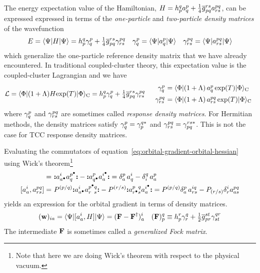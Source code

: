 \documentclass[11pt]{article}
\numberwithin{equation}{section}
\begin{document}
\begin{dfn}
The energy expectation value of the Hamiltonian,
$
  H
=
  h_p^q
  a^p_q
+
  \tfrac{1}{4}
  \overline{g}_{pq}^{rs}
  a^{pq}_{rs}
$,
can be expressed expressed in terms of the \textit{one-particle} and \textit{two-particle density matrices} of the wavefunction
\begin{align}
\label{eq:one-and-two-particle-density-matrices}
  E
=
  \langle\Psi |H|\Psi \rangle
=
  h_p^q
  \gamma ^p_q
+
  \tfrac{1}{4}
  \overline{g}_{pq}^{rs}
  \gamma ^{pq}_{rs}
&&
  \gamma ^p_q
=
  \langle\Psi |a^p_q|\Psi \rangle
&&
  \gamma ^{pq}_{rs}
=
  \langle\Psi |a^{pq}_{rs}|\Psi \rangle
\end{align}
which generalize the one-particle reference density matrix that we have already encountered.
In traditional coupled-cluster theory, this expectation value is the coupled-cluster Lagrangian and we have
\begin{align}
  \mc{L}
=
  \ip{\F|(1+\La)H\mr{exp}(T)|\F}_\mr{C}
=
  h_p^q
  \g^p_q
+
  \tfr{1}{4}
  \ol{g}_{pq}^{rs}
  \g^{pq}_{rs}
&&
\begin{array}{r@{\ }l}
  \g^p_q
&=
  \ip{\F|(1 + \La)\, a^p_q\,\mr{exp}(T)|\F}_\mr{C}
\\[5pt]
  \g^{pq}_{rs}
&=
  \ip{\F|(1 + \La)\, a^{pq}_{rs}\,\mr{exp}(T)|\F}_\mr{C}
\end{array}
\end{align}
where $\gamma ^p_q$ and $\gamma ^{pq}_{rs}$ are sometimes called \textit{response density matrices}.
For Hermitian methods, the density matrices satisfy $\gamma ^p_q=\gamma ^{q*}_{p}$ and $\gamma ^{pq}_{rs}=\gamma ^{rs*}_{pq}$.
This is not the case for TCC response density matrices.
\end{dfn}


\begin{rmk}
Evaluating the commutators of equation~\ref{eq:orbital-gradient-orbital-hessian} using Wick's theorem\footnote{
  Note that here we are doing Wick's theorem with respect to the physical vacuum.
}
\begin{align}
  [a_a^i, a^p_q]
=&\
  \no{
    a^i_{a^\ptcl}
    a^{p^\ptcl}_q
  }
-
  \no{
    a^p_{q^\ptcl}
    a^{i^\ptcl}_a
  }
=
  \d^p_a\,
  a^i_q
-
  \d^q_i\,
  a^p_a
\\
  [a_a^i, a^{pq}_{rs}]
=&\
  P^{(p/q)}
  \no{
    a^i_{a^\ptcl}
    a^{p^\ptcl q}_{r^{\phantom\ptcl}s}
  }
-
  P^{(r/s)}
  \no{
    a^{p^{\phantom\ptcl}q}_{r^\ptcl s}
    a^{i^\ptcl}_a
  }
=
  P^{(p/q)}
  \d^p_a\,
  a^{iq}_{rs}
-
  P_{(r/s)}
  \d^i_r
  a^{pq}_{as}
\end{align}
yields an expression for the orbital gradient in terms of density matrices.
\begin{align}
  (\mathbf{w})_{ia}
=
  \langle\Psi |[a_a^i, H]|\Psi \rangle
=
  (
    \mathbf{F}
  -
    \mathbf{F}^\dagger
  )_a^i
&&
  (\mathbf{F})_p^q
\equiv
  h_p^r
  \gamma ^q_r
+
  \tfrac{1}{2}
  \overline{g}_{pr}^{st}
  \gamma ^{qr}_{st}
\end{align}
The intermediate $\mathbf{F}$ is sometimes called a \textit{generalized Fock matrix}.
\end{rmk}
\end{document}
